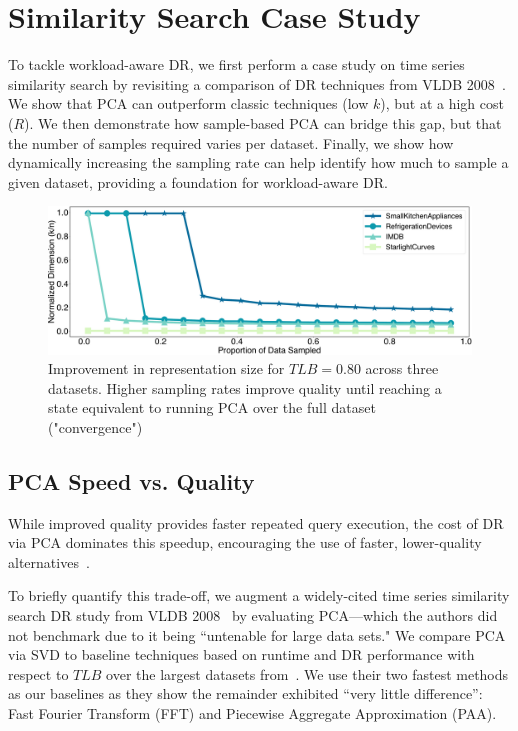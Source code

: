 \section{Similarity Search Case Study}
\label{sec:sampling}

To tackle workload-aware DR, we first perform a case study on time series similarity search by revisiting a comparison of DR techniques from VLDB 2008~\cite{keogh-study}. 
We show that PCA can outperform classic techniques (low $k$), but at a high cost ($R$).
We then demonstrate how sample-based PCA can bridge this gap, but that the number of samples required varies per dataset.
Finally, we show how dynamically increasing the sampling rate can help identify how much to sample a given dataset, providing a foundation for workload-aware DR.

\begin{figure}
\includegraphics[width=\linewidth]{figs/progressive.pdf}
\caption[]{ Improvement in representation size for  $TLB = 0.80$ across three datasets. Higher sampling rates improve quality until reaching a state equivalent to running PCA over the full dataset ("convergence")}
\label{fig:progressive}
\end{figure}

\subsection{PCA Speed vs. Quality}

While improved quality provides faster repeated query execution, the cost of DR via PCA dominates this speedup, encouraging the use of faster, lower-quality alternatives~\cite{keogh-study}. 

To briefly quantify this trade-off, we augment a widely-cited time series similarity search DR study from VLDB 2008~\cite{keogh-study} by evaluating PCA---which the authors did not benchmark due to it being ``untenable for large data sets." 
We compare PCA via SVD to baseline techniques based on runtime and DR performance with respect to $TLB$ over the largest datasets from~\cite{keogh-study}. 
We use their two fastest methods as our baselines as they show the remainder exhibited ``very little difference'': Fast Fourier Transform (FFT) and Piecewise Aggregate Approximation (PAA).

